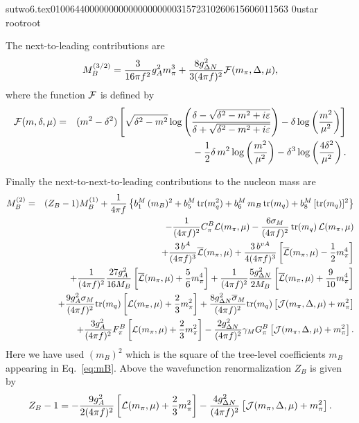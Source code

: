                                                                                                                                                                                                                                                                                       sutwo6.tex                                                                                          0100644 0000000 0000000 00000315723 10260615606 011563  0                                                                                                    ustar   root                            root                                                                                                                                                                                                                   \documentclass[prd,amssymb,amsmath,showpacs,nofootinbib,superscriptaddress]{revtex4}
\begin{document}
The next-to-leading contributions are
\begin{equation}
  M^{(3/2)}_B = 
    \frac{3}{16 \pi f^2} g_A^2  m_\pi^3 
    + \frac{8 g_{{\Delta} N}^2}{3 (4 \pi f)^2} {\mathcal F} (m_\pi,{\Delta},\mu)
,\label{eq:MBNLO}
\end{equation}
where the function ${\mathcal F}$ is defined by
\begin{eqnarray}
  {\mathcal F} (m,{\delta},\mu) &=& (m^2 - {\delta}^2) 
    \left[ \sqrt{{\delta}^2 - m^2}
      \log \left( 
        \frac{{\delta} - \sqrt{{\delta}^2 - m^2 + i \varepsilon}}
        {{\delta} + \sqrt{{\delta}^2 - m^2 + i \varepsilon}} \right)
      - {\delta} \log \left( \frac{m^2}{\mu^2} \right)
    \right] \notag \\
    && \phantom{sp} - \frac{1}{2} {\delta}\, m^2 \log \left( \frac{m^2}{\mu^2} \right)
                    - {\delta}^3 \log \left( \frac{4 {\delta}^2}{\mu^2} \right)
\label{eqn:F}
.\end{eqnarray}
 



Finally the next-to-next-to-leading contributions to the nucleon mass are
\begin{eqnarray}
M_B^{(2)} &=& ( Z_B - 1) M_B^{(1)} 
  + \frac{1}{4 \pi f} \left\{
    b_1^M \, (m_B)^2 + b_5^M \, \text{tr} (m_q^2) + b_6^M \, m_B \, \text{tr}(m_q)
    + b_8^M \, [\text{tr}(m_q)]^2 \right\} \notag \\
&& 
  - \frac{1}{(4 \pi f)^2} C^B_\pi {\mathcal L} (m_\pi,\mu) 
    - \frac{6 \sigma_M}{(4 \pi f)^2} \, \text{tr}(m_q)\,  {\mathcal L} (m_\pi,\mu) \notag \\
&& 
  + \frac{3\, b^A}{(4 \pi f)^3} {\overline{{\mathcal L}}} (m_\pi, \mu) 
    + \frac{3\, b^{vA}}{4 (4 \pi f)^3} \left[ {\overline{{\mathcal L}}} (m_\pi, \mu) - \frac{1}{2} m_\pi^4 \right] \notag \\
&& 
  + \frac{1}{(4 \pi f)^2} \frac{27 g_A^2}{16 M_B} 
     \left[ {\overline{{\mathcal L}}} (m_\pi, \mu) + \frac{5}{6} m_\pi^4 \right]
    + \frac{1}{(4 \pi f)^2} \frac{5 g_{{\Delta} N}^2}{2 M_B}
     \left[ {\overline{{\mathcal L}}} (m_\pi, \mu) + \frac{9}{10} m_\pi^4 \right] \notag \\
&& 
  + \frac{ 9 g_A^2 \sigma_M }{ (4 \pi f)^2} \text{tr} (m_q) 
     \left[ {\mathcal L} (m_\pi, \mu) + \frac{2}{3} m_\pi^2 \right] 
    + \frac{8 g_{{\Delta} N}^2 {\overline{\sigma}}_M }{(4 \pi f)^2} \text{tr}(m_q)
     \left[ {\mathcal J} (m_\pi, {\Delta}, \mu) + m_\pi^2 \right] \notag \\
&& 
  + \frac{3g_A^2}{ (4 \pi f)^2} F^B_\pi \left[ {\mathcal L} (m_\pi, \mu) + \frac{2}{3} m_\pi^2 \right]
     - \frac{2 g_{{\Delta} N}^2}{(4 \pi f)^2} \gamma_M G^B_\pi
     \left[ {\mathcal J} (m_\pi, {\Delta}, \mu) + m_\pi^2 \right] 
.\label{e:MBNNLO} \end{eqnarray}
%
Here we have used $(m_B)^2$ which is the square of the tree-level
coefficients $m_B$ appearing in Eq.~\eqref{eq:mB}.
%
%
Above the wavefunction renormalization $Z_B$ is given by
\begin{equation}
  Z_B - 1 = 
     - \frac{9 g_A^2}{2 (4 \pi f )^2} \left[  {\mathcal L}(m_\pi , \mu) +
       \frac{2}{3} m_\pi^2 \right]
     - \frac{4 g_{{\Delta} N}^2}{(4 \pi f)^2 } \left[ {\mathcal J}(m_\pi, {\Delta}, \mu) +
       m_\pi^2 \right]
.\label{e:ZB} 
\end{equation}
\end{document}
